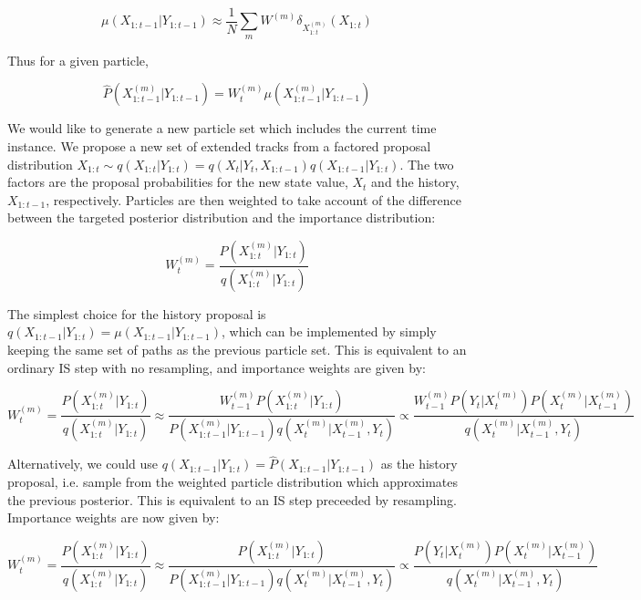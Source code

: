 \begin{equation}
\mu(X_{1:t-1}|Y_{1:t-1}) \approx \frac{1}{N} \sum_m{W^{(m)} \delta_{X_{1:t}^{(m)}} (X_{1:t})}
\label{eq:UnweightParticleDistn}
\end{equation}

Thus for a given particle,

\begin{equation}
\hat{P}(X_{1:t-1}^{(m)}|Y_{1:t-1}) = W_t^{(m)} \mu(X_{1:t-1}^{(m)}|Y_{1:t-1})
\label{eq:}
\end{equation}

We would like to generate a new particle set which includes the current time instance. We propose a new set of extended tracks from a factored proposal distribution $X_{1:t} \sim q(X_{1:t}|Y_{1:t}) = q(X_{t}|Y_{t}, X_{1:t-1}) q(X_{1:t-1}|Y_{1:t})$. The two factors are the proposal probabilities for the new state value, $X_t$ and the history, $X_{1:t-1}$, respectively. Particles are then weighted to take account of the difference between the targeted posterior distribution and the importance distribution:

\begin{equation}
W_t^{(m)} = \frac{P(X_{1:t}^{(m)}|Y_{1:t})}{q(X_{1:t}^{(m)}|Y_{1:t})}
\label{eq:ImportanceWeights}
\end{equation}

The simplest choice for the history proposal is $q(X_{1:t-1}|Y_{1:t}) = \mu(X_{1:t-1}|Y_{1:t-1})$, which can be implemented by simply keeping the same set of paths as the previous particle set. This is equivalent to an ordinary IS step with no resampling, and importance weights are given by:

\begin{equation}
W_t^{(m)} = \frac{P(X_{1:t}^{(m)}|Y_{1:t})}{q(X_{1:t}^{(m)}|Y_{1:t})}
\approx \frac{W_{t-1}^{(m)}P(X_{1:t}^{(m)}|Y_{1:t})}{P(X_{1:t-1}^{(m)}|Y_{1:t-1}) q(X_{t}^{(m)}|X_{t-1}^{(m)}, Y_{t})}
\propto \frac{W_{t-1}^{(m)} P(Y_t|X_t^{(m)})P(X_t^{(m)}|X_{t-1}^{(m)})}{q(X_t^{(m)}|X_{t-1}^{(m)}, Y_t)}
\label{eq:NoResampIW}
\end{equation}

Alternatively, we could use $q(X_{1:t-1}|Y_{1:t}) = \hat{P}(X_{1:t-1}|Y_{1:t-1})$ as the history proposal, i.e. sample from the weighted particle distribution which approximates the previous posterior. This is equivalent to an IS step preceeded by resampling. Importance weights are now given by:

\begin{equation}
W_t^{(m)} = \frac{P(X_{1:t}^{(m)}|Y_{1:t})}{q(X_{1:t}^{(m)}|Y_{1:t})}
\approx \frac{P(X_{1:t}^{(m)}|Y_{1:t})}{P(X_{1:t-1}^{(m)}|Y_{1:t-1}) q(X_{t}^{(m)}|X_{t-1}^{(m)}, Y_{t})}
\propto \frac{ P(Y_t|X_t^{(m)})P(X_t^{(m)}|X_{t-1}^{(m)})}{q(X_t^{(m)}|X_{t-1}^{(m)}, Y_t)}
\label{eq:WithResampIW}
\end{equation}


